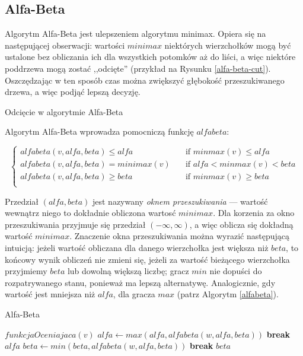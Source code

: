 \documentclass{pracamgr}
\begin{document}
\subsection{Alfa-Beta}

Algorytm Alfa-Beta jest ulepszeniem algorytmu minimax.
Opiera się na następującej obserwacji: wartości \(minimax\) niektórych wierzchołków mogą być ustalone bez obliczania ich dla wszystkich potomków aż do liści, a więc niektóre poddrzewa mogą zostać ,,odcięte'' (przykład na Rysunku \ref{alfa-beta-cut}).
Oszczędzając w ten sposób czas można zwiększyć głębokość przeszukiwanego drzewa, a więc podjąć lepszą decyzję.

\begin{rysunek}
\caption{Odcięcie w algorytmie Alfa-Beta \label{alfa-beta-cut}}
\centering

\end{rysunek}

Algorytm Alfa-Beta wprowadza pomocniczą funkcję \(alfabeta\):

\[
  \begin{cases}
    alfabeta(v, alfa, beta) \leq alfa    & \quad \text{if } minmax(v) \leq alfa\\
    alfabeta(v, alfa, beta) = minimax(v) & \quad \text{if } alfa < minmax(v) < beta \\
    alfabeta(v, alfa, beta) \geq beta    & \quad \text{if } minmax(v) \geq beta \\
  \end{cases}
\]

Przedział \((alfa, beta)\) jest nazywany \emph{oknem przeszukiwania} --- wartość wewnątrz niego to dokładnie obliczona wartosć \(minimax\).
Dla korzenia za okno przeszukiwania przyjmuje się przedział \((-\infty, \infty)\), a więc oblicza się dokładną wartość \(minimax\).
Znaczenie okna przeszukiwania można wyrazić następującą intuicją: jeżeli wartość obliczana dla danego wierzchołka jest większa niż \(beta\), to końcowy wynik obliczeń nie zmieni się, jeżeli za wartość bieżącego wierzchołka przyjmiemy \(beta\) lub dowolną większą liczbę; gracz \(min\) nie dopuści do rozpatrywanego stanu, ponieważ ma lepszą alternatywę.
Analogicznie, gdy wartość jest mniejsza niż \(alfa\), dla gracza \(max\) (patrz Algorytm \ref{alfabeta}).

\begin{algorytm}
\caption{Alfa-Beta\label{alfabeta}}
\begin{algorithmic}[1]
	\State \Return $funkcjaOceniajaca(v)$
\EndIf
        \State $alfa \gets max(alfa, alfabeta(w, alfa, beta))$
            \State \textbf{break}
        \EndIf
    \EndFor
	\State \Return $alfa$
\Else
        \State $beta \gets min(beta, alfabeta(w, alfa, beta))$
            \State \textbf{break}
        \EndIf
    \EndFor
	\State \Return $beta$
\EndIf
\EndFunction
\end{algorithmic}
\end{algorytm}
\end{document}
